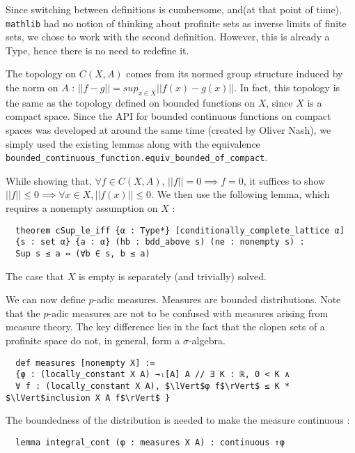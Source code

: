 \documentclass[a4paper,UKenglish,cleveref, autoref, thm-restate]{lipics-v2021}
\newcommand{\lean}[1]{\texttt{#1}\xspace} %
\begin{document}
Since switching between definitions is cumbersome, and(at that point of time), \lean{mathlib}
had no notion of thinking about profinite sets as inverse limits of finite sets, we chose to work
with the second definition. However, this is already a Type, hence there is no need to redefine it.

The topology on $C(X, A)$ comes from its normed group structure induced by the norm on $A$ :
$|| f - g || = sup_{x \in X} || f(x) - g(x) ||$. In fact, this topology is the same as the 
topology defined on bounded functions on $X$, since $X$ is a compact space. Since the API for bounded 
continuous functions on compact spaces was developed at around the same time (created by Oliver Nash), 
we simply used the existing lemmas along with the equivalence 
\lean{bounded\_continuous\_function.equiv\_bounded\_of\_compact}. 

While showing that, $\forall f \in C(X, A)$, $||f|| = 0 \implies f = 0$, it suffices to show 
$||f|| \le 0 \implies \forall x \in X, ||f(x)|| \le 0$. We then use the following lemma, which 
requires a nonempty assumption on $X$ :
\begin{lstlisting}
  theorem cSup_le_iff {α : Type*} [conditionally_complete_lattice α] 
  {s : set α} {a : α} (hb : bdd_above s) (ne : nonempty s) : 
  Sup s ≤ a ↔ (∀b ∈ s, b ≤ a)
\end{lstlisting}

The case that $X$ is empty is separately (and trivially) solved. 

We can now define $p$-adic measures. Measures are bounded distributions. Note that the $p$-adic measures
are not to be confused with measures arising from measure theory. The key difference lies in the
fact that the clopen sets of a profinite space do not, in general, form a $\sigma$-algebra. 

\begin{lstlisting}
  def measures [nonempty X] :=
  {φ : (locally_constant X A) →ₗ[A] A // ∃ K : ℝ, 0 < K ∧ 
  ∀ f : (locally_constant X A), $\lVert$φ f$\rVert$ ≤ K * $\lVert$inclusion X A f$\rVert$ }
\end{lstlisting}

The boundedness of the distribution is needed to make the measure continuous :
\begin{lstlisting}
  lemma integral_cont (φ : measures X A) : continuous ⇑φ
\end{lstlisting}
\end{document}
